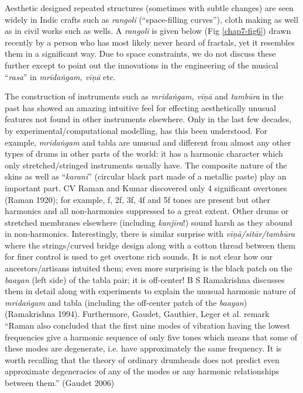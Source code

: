 Aesthetic designed repeated structures (sometimes with subtle changes) are seen widely in Indic crafts such as \textsl{rangoli} (“space-filling curves”), cloth making as well as in civil works such as wells. A \textsl{rangoli} is given below (Fig \ref{chap7-fig6}) drawn recently by a person who has most likely never heard of fractals, yet it resembles them in a significant way. Due to space constraints, we do not discuss these further except to point out the innovations in the engineering of the musical “\textsl{rasa}” in \textsl{mridaṅgam, vīṇā} etc.

The construction of instruments such as \textsl{mridaṅgam, vīṇā} and \textsl{tambūra} in the past has showed an amazing intuitive feel for effecting aesthetically unusual features not found in other instruments elsewhere. Only in the last few decades, by experimental/computational modelling, has this been understood. For example, \textsl{mridaṅgam} and tabla are unusual and different from almost any other types of drums in other parts of the world: it has a harmonic character which only stretched/stringed instruments usually have. The composite nature of the skins as well as “\textsl{karani}” (circular black part made of a metallic paste) play an important part.  CV Raman and Kumar discovered only 4 significant overtones (Raman 1920); for example, f, 2f, 3f, 4f and 5f tones are present but other harmonics and all non-harmonics suppressed to a great extent. Other drums or stretched membranes elsewhere (including \textsl{kanjīra}!) sound harsh as they abound in non-harmonics. Interestingly, there is similar surprise with \textsl{vīṇā/sitār/tambūra} where the strings/curved bridge design along with a cotton thread between them for finer control is used to get overtone rich sounds. It is not clear how our ancestors/artisans intuited them; even more surprising is the black patch on the \textsl{baayan} (left side) of the tabla pair; it is off-center! B S Ramakrishna discusses them in detail along with experiments to explain the unusual harmonic nature of \textsl{mridaṅgam} and tabla (including the off-center patch of the \textsl{baayan}) (Ramakrishna 1994). Furthermore, Gaudet, Gauthier, Leger et al. remark “Raman also concluded that the first nine modes of vibration having the lowest frequencies give a harmonic sequence of only five tones which means that some of these modes are degenerate, i.e. have approximately the same frequency. It is worth recalling that the theory of ordinary drumheads does not predict even approximate degeneracies of any of the modes or any harmonic relationships between them.” (Gaudet 2006)
